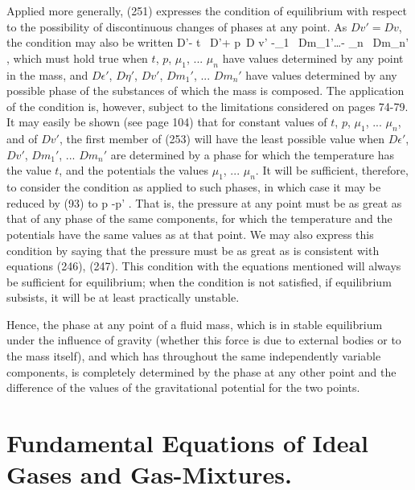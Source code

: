 \documentclass[12pt]{article}
\begin{document}
Applied more generally, (251) expresses the condition of equilibrium with respect to the possibility of discontinuous changes of phases at any point. As $Dv'= Dv$, the condition may also be written
\eqs D\epsilon'- t \, D\eta'+ p \,D v' -\mu_1 \, Dm_1'\dots - \mu_n \, Dm_n' , \label{253}\eqe
which must hold true when $t$, $p$, $\mu_1$, ... $\mu_n$ have values determined by any point in the mass, and $D\epsilon'$, $D\eta'$, $Dv'$, $Dm_1'$, ... $Dm_n'$ have values determined by any possible phase of the substances of which the mass is composed. The application of the condition is, however, subject to the limitations considered on pages 74-79. It may easily be shown (see page 104) that for constant values of $t$, $p$, $\mu_1$, ... $\mu_n$, and of $Dv'$, the first member of (253) will have the least possible value when $D\epsilon'$, $Dv'$, $Dm_1'$, ... $Dm_n'$ are determined by a phase for which the temperature has the value $t$, and the potentials the values $\mu_1$, ... $\mu_n$. It will be sufficient, therefore, to consider the condition as applied to such phases, in which case it may be reduced by (93) to
\eqs p -p' . \label{254}\eqe
That is, the pressure at any point must be as great as that of any phase of the same components, for which the temperature and the potentials have the same values as at that point. We may also express this condition by saying that the pressure must be as great as is consistent with equations (246), (247). This condition with the equations mentioned will always be sufficient for equilibrium; when the condition is not satisfied, if equilibrium subsists, it will be at least practically unstable.


Hence, the phase at any point of a fluid mass, which is in stable equilibrium under the influence of gravity (whether this force is due to external bodies or to the mass itself), and which has throughout the same independently variable components, is completely determined by the phase at any other point and the difference of the values of the gravitational potential for the two points.


\section{Fundamental Equations of Ideal Gases and Gas-Mixtures.}
\end{document}
